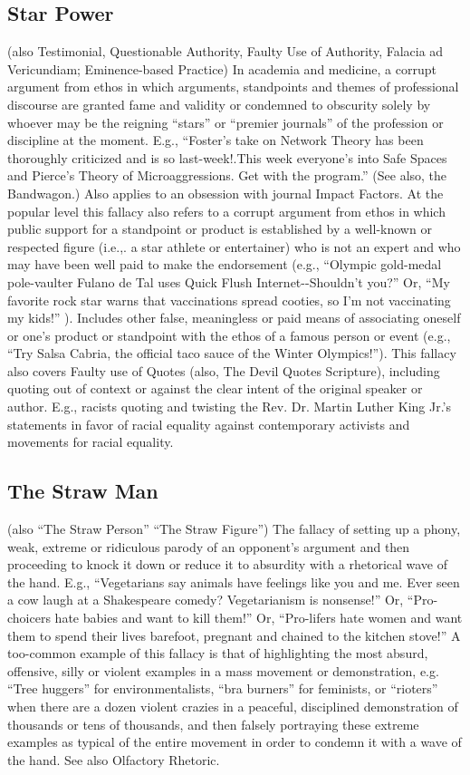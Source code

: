 \documentclass[10pt,a4paper,british]{article}
\begin{document}
\begin{multicols}{2}
    \subsection{Star Power} (also Testimonial, Questionable Authority, Faulty Use of Authority, Falacia ad Vericundiam; Eminence{-}based Practice) In academia and medicine, a corrupt argument from ethos in which arguments, standpoints and themes of professional discourse are granted fame and validity or condemned to obscurity solely by whoever may be the reigning ``stars'' or ``premier journals'' of the profession or discipline at the moment. E.g., ``Foster's take on Network Theory has been thoroughly criticized and is so last{-}week!.This week everyone's into Safe Spaces and Pierce's Theory of Microaggressions. Get with the program.'' (See also, the Bandwagon.) Also applies to an obsession with journal Impact Factors. At the popular level this fallacy also refers to a corrupt argument from ethos in which public support for a standpoint or product is established by a well{-}known or respected figure (i.e.,. a star athlete or entertainer) who is not an expert and who may have been well paid to make the endorsement (e.g., ``Olympic gold{-}medal pole{-}vaulter Fulano de Tal uses Quick Flush Internet{-}{-}Shouldn’t you?'' Or, ``My favorite rock star warns that vaccinations spread cooties, so I'm not vaccinating my kids!'' ). Includes other false, meaningless or paid means of associating oneself or one’s product or standpoint with the ethos of a famous person or event (e.g., “Try Salsa Cabria, the official taco sauce of the Winter Olympics!”). This fallacy also covers Faulty use of Quotes (also, The Devil Quotes Scripture), including quoting out of context or against the clear intent of the original speaker or author.  E.g., racists quoting and twisting the Rev. Dr. Martin Luther King Jr.'s statements in favor of racial equality against contemporary activists and movements for racial equality.  

    \subsection{The Straw Man} (also ``The Straw Person'' ``The Straw Figure'') The fallacy of setting up a phony, weak, extreme or ridiculous parody of an opponent's argument and then proceeding to knock it down or reduce it to absurdity with a rhetorical wave of the hand. E.g., ``Vegetarians say animals have feelings like you and me. Ever seen a cow laugh at a Shakespeare comedy? Vegetarianism is nonsense!'' Or, ``Pro{-}choicers hate babies and want to kill them!'' Or, ``Pro{-}lifers hate women and want them to spend their lives barefoot, pregnant and chained to the kitchen stove!'' A too{-}common example of this fallacy is that of highlighting the most absurd, offensive, silly or violent examples in a mass movement or demonstration, e.g. ``Tree huggers'' for environmentalists, ``bra burners'' for feminists, or ``rioters'' when there are a dozen violent crazies in a peaceful, disciplined demonstration of thousands or tens of thousands, and then falsely portraying these extreme examples as typical of the entire movement in order to condemn it with a wave of the hand. See also Olfactory Rhetoric.  


\end{multicols}
\end{document}
